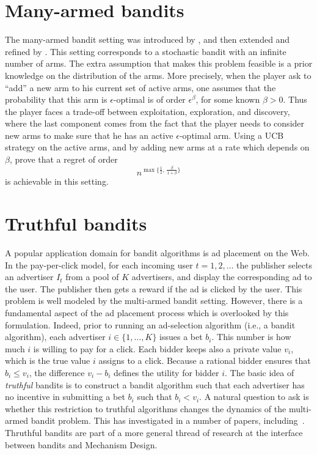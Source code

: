 \section{Many-armed bandits}
The many-armed bandit setting was introduced by \cite{BCZHS97}, and then extended and refined by \cite{WAM08}. This setting corresponds to a stochastic bandit with an infinite number of arms. The extra assumption that makes this problem feasible is a prior knowledge on the distribution of the arms. More precisely, when the player ask to ``add'' a new arm to his current set of active arms, one assumes that the probability that this arm is $\epsilon$-optimal is of order $\epsilon^{\beta}$, for some known $\beta > 0$. Thus the player faces a trade-off between exploitation, exploration, and discovery, where the last component comes from the fact that the player needs to consider new arms to make sure that he has an active $\epsilon$-optimal arm. Using a UCB strategy on the active arms, and by adding new arms at a rate which depends on $\beta$, \cite{WAM08} prove that a regret of order
\[
    n^{\max \bigl\{\frac12,\, \frac{\beta}{1+\beta}\bigr\}}
\]
is achievable in this setting.

\section{Truthful bandits} \label{sec:truthful}
A popular application domain for bandit algorithms is ad placement on the Web. In the pay-per-click model, for each incoming user $t=1,2,\dots$ the publisher selects an advertiser $I_t$ from a pool of $K$ advertisers, and display the corresponding ad to the user. The publisher then gets a reward if the ad is clicked by the user. This problem is well modeled by the multi-armed bandit setting. However, there is a fundamental aspect of the ad placement process which is overlooked by this formulation. Indeed, prior to running an ad-selection algorithm (i.e., a bandit algorithm), each advertiser $i \in \{1, \hdots, K\}$ issues a bet $b_i$. This number is how much $i$ is willing to pay for a click. Each bidder keeps also a private value $v_i$, which is the true value $i$ assigns to a click. Because a rational bidder ensures that $b_i \le v_i$, the difference $v_i-b_i$ defines the utility for bidder $i$. The basic idea of {\em truthful} bandits is to construct a bandit algorithm such that each advertiser has no incentive in submitting a bet $b_i$ such that $b_i < v_i$. A natural question to ask is whether this restriction to truthful algorithms changes the dynamics of the multi-armed bandit problem. This has investigated in a number of papers, including~\cite{BSS09, DK09, BKS10, WS12}. Thruthful bandits are part of a more general thread of research at the interface between bandits and Mechanism Design.


